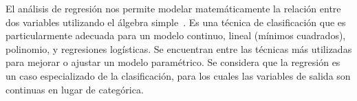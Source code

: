 

	El análisis de regresión nos permite modelar matemáticamente la relación entre dos variables utilizando el álgebra simple~\cite{gollapudi2016practical}.
	Es una técnica de clasificación que es particularmente adecuada para un modelo continuo, lineal (mínimos cuadrados), polinomio, y regresiones logísticas. Se encuentran entre las técnicas más utilizadas para mejorar o ajustar un modelo paramétrico. Se considera que la regresión es un caso especializado de la  clasificación, para los cuales las variables de salida son continuas en lugar de categórica.

